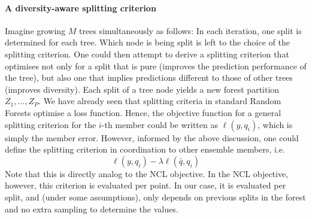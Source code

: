 \documentclass[
	twoside=false, %
]{kaobook}
\begin{document}
\paragraph{A diversity-aware splitting criterion} Imagine growing $M$ trees simultaneously as follows: In each iteration, one split is determined for each tree. Which node is being split is left to the choice of the splitting criterion. 
One could then attempt to derive a splitting criterion that optimises not only for a split that is pure (improves the prediction performance of the tree), but also one that implies predictions different to those of other trees (improves diversity). Each split of a tree node yields a new forest partition $Z_{1}, \dots, Z_{P}$. 
We have already seen that splitting criteria in standard Random Forests optimise a loss function. Hence, the objective function for a general splitting criterion for the $i$-th member could be written as  $\ell(y, q_{i})$, which is simply the member error. However, informed by the above discussion, one could define the splitting criterion in coordination to other ensemble members, i.e.
$$
\ell(y, q_{i}) - \lambda \ell(\bar{q}, q_{i})
$$
Note that this is directly analog to the NCL objective. In the NCL objective, however, this criterion is evaluated per point. In our case, it is evaluated per split, and (under some assumptions), only depends on previous splits in the forest and no extra sampling to determine the values.
\end{document}
